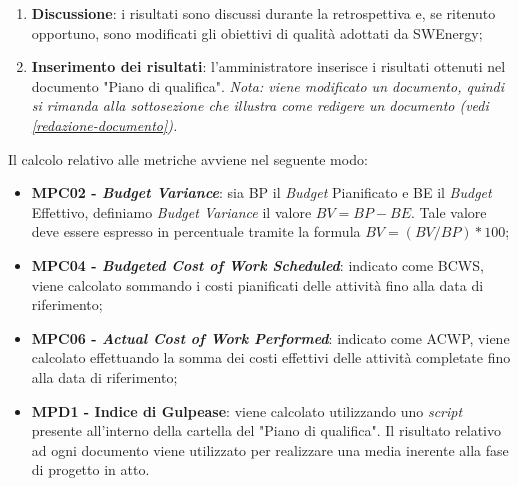 \begin{itemize}
\begin{enumerate}
		      \item \textbf{Discussione}: i risultati sono discussi durante la
		            retrospettiva e, se ritenuto opportuno, sono modificati
		            gli obiettivi di qualità adottati da SWEnergy;

		      \item \textbf{Inserimento dei risultati}: l'amministratore
		            inserisce i risultati ottenuti nel documento "Piano di
		            qualifica".
		            \textit{Nota: viene modificato un documento, quindi si rimanda
			            alla sottosezione che illustra come redigere un documento
			            (vedi \cref{redazione-documento}).}
	      \end{enumerate}
\end{itemize}

Il calcolo relativo alle metriche avviene nel seguente modo:
\begin{itemize}
	\item \textbf{MPC02 - \textit{Budget Variance}}: sia BP il \textit{Budget} Pianificato e BE il \textit{Budget} Effettivo, definiamo \textit{Budget Variance} il valore $BV = BP - BE$.
	      Tale valore deve essere espresso in percentuale tramite la formula $BV = (BV / BP) * 100$;
	\item \textbf{MPC04 - \textit{Budgeted Cost of Work Scheduled}}: indicato come BCWS, viene calcolato sommando i costi pianificati delle attività fino alla data di riferimento;
	\item \textbf{MPC06 - \textit{Actual Cost of Work Performed}}: indicato come ACWP, viene calcolato effettuando la somma dei costi effettivi delle attività completate fino alla data di riferimento;
	\item \textbf{MPD1 - Indice di Gulpease}: viene calcolato utilizzando uno \textit{script} presente all'interno della cartella del "Piano di qualifica".
	      Il risultato relativo ad ogni documento viene utilizzato per realizzare una media inerente alla fase di progetto in atto.
\end{itemize}
